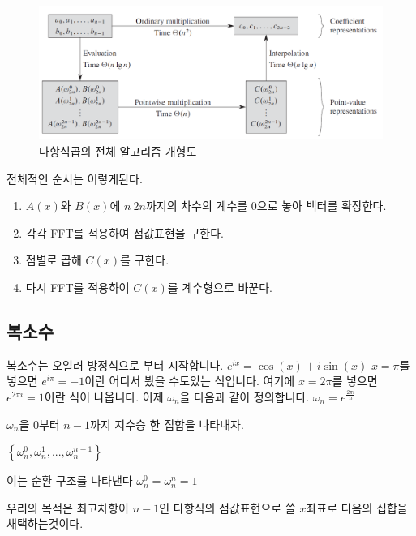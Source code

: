 \documentclass{oblivoir}
\begin{document}
\begin{figure}[h!]
    \includegraphics[scale=0.5]{pic1.PNG}
    \caption{다항식곱의 전체 알고리즘 개형도}
\end{figure}

전체적인 순서는 이렇게된다.
\begin{enumerate}
    \item $A(x)$와 $B(x)$에 $n~2n$까지의 차수의 계수를 0으로 놓아 벡터를 확장한다.
    \item 각각 FFT를 적용하여 점값표현을 구한다.
    \item 점별로 곱해 $C(x)$를 구한다.
    \item 다시 FFT를 적용하여 $C(x)$를 계수형으로 바꾼다.
\end{enumerate}




\subsection{복소수}
복소수는 오일러 방정식으로 부터 시작합니다.
$e^{ix} = \cos(x) +i\sin(x)$
$x = \pi$를 넣으면 $e^{i\pi} = -1$이란 어디서 봤을 수도있는 식입니다.
여기에 $x = 2\pi$를 넣으면 $e^{2\pi i} = 1$이란 식이 나옵니다. 
이제 $\omega_n$을 다음과 같이 정의합니다.
$\omega_n = e^{\frac{2\pi i}{n}}$ 

$\omega_n$을 $0$부터 $n-1$까지 지수승 한 집합을 나타내자.

$\left\{\omega_n^0,\omega_n^1, ... , \omega_n^{n-1} \right\}$

이는 순환 구조를 나타낸다 
$\omega_n ^0 = \omega_n^n = 1$

우리의 목적은 최고차항이 $n-1$인 다항식의 점값표현으로 쓸 $x$좌표로 다음의 집합을 채택하는것이다.
\end{document}
